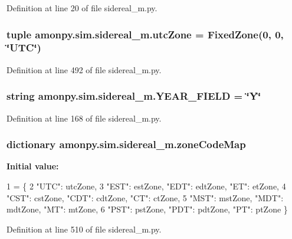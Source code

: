 Definition at line 20 of file sidereal\-\_\-m.\-py.

\hypertarget{namespaceamonpy_1_1sim_1_1sidereal__m_adc5dc1cfd4981bd421a8a994c76c65d4}{
\subsubsection[{utc\-Zone}]{\setlength{\rightskip}{0pt plus 5cm}tuple amonpy.\-sim.\-sidereal\-\_\-m.\-utc\-Zone = {\bf Fixed\-Zone}(0, 0, \char`\"{}U\-T\-C\char`\"{})}}\label{namespaceamonpy_1_1sim_1_1sidereal__m_adc5dc1cfd4981bd421a8a994c76c65d4}


Definition at line 492 of file sidereal\-\_\-m.\-py.

\hypertarget{namespaceamonpy_1_1sim_1_1sidereal__m_ae92c9b6866dbee32a46400d7f0572abb}{
\subsubsection[{Y\-E\-A\-R\-\_\-\-F\-I\-E\-L\-D}]{\setlength{\rightskip}{0pt plus 5cm}string amonpy.\-sim.\-sidereal\-\_\-m.\-Y\-E\-A\-R\-\_\-\-F\-I\-E\-L\-D = \char`\"{}Y\char`\"{}}}\label{namespaceamonpy_1_1sim_1_1sidereal__m_ae92c9b6866dbee32a46400d7f0572abb}


Definition at line 168 of file sidereal\-\_\-m.\-py.

\hypertarget{namespaceamonpy_1_1sim_1_1sidereal__m_aac98a8043e8f150f085d5d35e9420702}{
\subsubsection[{zone\-Code\-Map}]{\setlength{\rightskip}{0pt plus 5cm}dictionary amonpy.\-sim.\-sidereal\-\_\-m.\-zone\-Code\-Map}}\label{namespaceamonpy_1_1sim_1_1sidereal__m_aac98a8043e8f150f085d5d35e9420702}
{\bfseries Initial value\-:}
\begin{DoxyCode}
1 = \{
2     \textcolor{stringliteral}{"UTC"}: utcZone,
3     \textcolor{stringliteral}{"EST"}: estZone,    \textcolor{stringliteral}{"EDT"}: edtZone,    \textcolor{stringliteral}{"ET"}:  etZone,
4     \textcolor{stringliteral}{"CST"}: cstZone,    \textcolor{stringliteral}{"CDT"}: cdtZone,    \textcolor{stringliteral}{"CT"}:  ctZone,
5     \textcolor{stringliteral}{"MST"}: mstZone,    \textcolor{stringliteral}{"MDT"}: mdtZone,    \textcolor{stringliteral}{"MT"}:  mtZone,
6     \textcolor{stringliteral}{"PST"}: pstZone,    \textcolor{stringliteral}{"PDT"}: pdtZone,    \textcolor{stringliteral}{"PT"}:  ptZone \}
\end{DoxyCode}


Definition at line 510 of file sidereal\-\_\-m.\-py.


